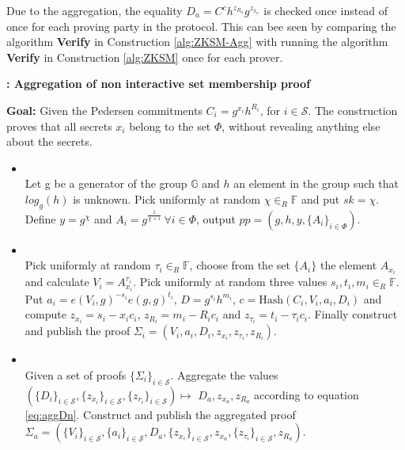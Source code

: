Due to the aggregation, the equality $D_a=C^ch^{z_{R_a}}g^{z_{x_a}}$ is checked once instead of once for each proving party in the protocol. This can bee seen by comparing the algorithm \textbf{Verify} in Construction \ref{alg:ZKSM-Agg} with running the algorithm \textbf{Verify} in Construction \ref{alg:ZKSM} once for each prover. 

\begin{algorithm}[]
\caption{\textbf{: Aggregation of non interactive set membership proof}}
\textbf{Goal:}  Given the Pedersen commitments $C_i=g^{x_i} h^{R_i}$, for $i\in\mathcal{S}$. The construction  proves that all secrets $x_i$ belong to the set $\Phi$, without revealing anything else about the secrets.
\vspace{2pt} 
\hline 
\vspace{2pt}
\begin{itemize}
  \item{}\\
 Let g be a generator of the group $\mathds{G}$ and $h$ an element in the group such that $log_g(h)$ is unknown.  
Pick uniformly at random $\chi\in_R\mathds{F}$ and put $sk=\chi$. Define $y=g^\chi$ and $A_i=g^{\frac{1}{\chi+i}} \:\forall i\in\Phi$, output $pp=(g,h,y,\{A_i\}_{i\in\Phi})$.

\item{}\\
Pick uniformly at random $\tau_i\in_R\mathds{F}$, choose from the set $\{A_i\}$ the element $A_{x_i}$ and calculate $V_i=A_{x_i}^{\tau_i}$. Pick uniformly at random three values $s_i,t_i,m_i\in_R\mathds{F}$. Put $a_i=e(V_i,g)^{-s_i}e(g,g)^{t_i}$,  $D=g^{s_i}h^{m_i}$, $c=\text{Hash}(C_i,V_i,a_i,D_i)$ and compute $z_{x_i} = s_i-x_i c_i$, $z_{R_i} = m_i-R_ic_i$ and $z_{\tau_i}= t_i-\tau_i c_i$.  Finally construct and publish the proof $\Sigma_i = (V_i,a_i,D_i,z_{x_i},z_{\tau_i},z_{R_i})$.

\item {} \\
Given a set of proofs  $\{\Sigma_i\}_{i\in\mathcal{S}}$. Aggregate the values $( \{D_i \}_{i\in\mathcal{S} }, \{ z_{x_i}\}_{i\in\mathcal{S} }, \{ z_{r_i}\}_{i\in\mathcal{S}  }) \mapsto$ $ D_a,z_{x_a},z_{R_a}$ according to equation \eqref{eq:aggDn}. Construct and publish the aggregated proof $\Sigma_a = (\{V_i\}_{i\in\mathcal{S} },\{a_i\}_{i\in\mathcal{S} },D_a,\{z_{x_i}\}_{i\in\mathcal{S} }, z_{x_a}, \{z_{\tau_i}\}_{i\in\mathcal{S} },z_{R_a})$.


\end{itemize}
\end{algorithm}
